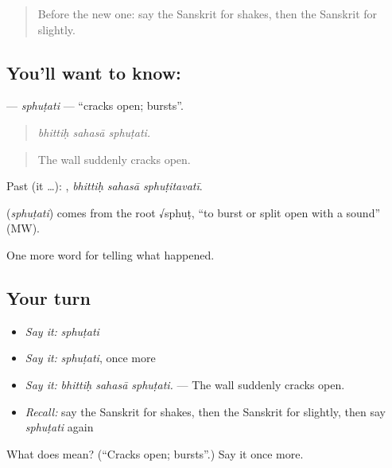 \begin{quote}
Before the new one: say the Sanskrit for shakes, then the Sanskrit for slightly.
\end{quote}

\subsection*{You'll want to know: }
\textbf{} — \emph{sphuṭati} — \textquotedblleft{}cracks open; bursts\textquotedblright{}.

\begin{quote}
  
\end{quote}

\begin{quote}
\emph{bhittiḥ sahasā sphuṭati.}
\end{quote}

\begin{quote}
The wall suddenly cracks open.
\end{quote}

Past (it …):   , \emph{bhittiḥ sahasā sphuṭitavatī}.

\begin{cousinweb}
\textbf{} (\emph{sphuṭati}) comes from the root √sphuṭ, \textquotedblleft{}to burst or split open with a sound\textquotedblright{} (MW).
\end{cousinweb}

\begin{grammarlens}[title={What you've built}]
One more word for telling what happened.
\end{grammarlens}

\subsection*{Your turn}
\begin{itemize}
\raggedright
  \item \emph{Say it:} \emph{sphuṭati}
  \item \emph{Say it:} \emph{sphuṭati}, once more
  \item \emph{Say it:} \emph{bhittiḥ sahasā sphuṭati.} — The wall suddenly cracks open.
  \item \emph{Recall:} say the Sanskrit for shakes, then the Sanskrit for slightly, then say \emph{sphuṭati} again
\end{itemize}

\begin{tcolorbox}[breakable,colback=teal!4,colframe=teal!35!black,title={Before you move on}]
What does  mean? (\textquotedblleft{}Cracks open; bursts\textquotedblright{}.) Say it once more.
\end{tcolorbox}

